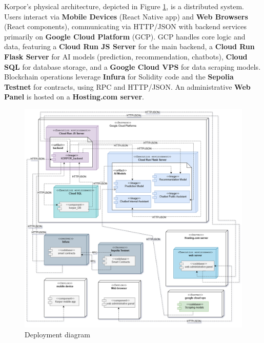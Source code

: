 Korpor's physical architecture, depicted in Figure \ref{fig:physical-architecture}, is a distributed system. Users interact via \textbf{\textcolor{primary}{Mobile Devices}} (React Native app) and \textbf{\textcolor{primary}{Web Browsers}} (React components), communicating via HTTP/JSON with backend services primarily on \textbf{\textcolor{primary}{Google Cloud Platform}} (GCP). GCP handles core logic and data, featuring a \textbf{\textcolor{primary}{Cloud Run JS Server}} for the main backend, a \textbf{\textcolor{primary}{Cloud Run Flask Server}} for AI models (prediction, recommendation, chatbots), \textbf{\textcolor{primary}{ Cloud SQL}} for database storage, and a \textbf{\textcolor{primary}{Google Cloud VPS}} for data scraping models. Blockchain operations leverage \textbf{\textcolor{primary}{Infura}} for Solidity code and the \textbf{\textcolor{primary}{Sepolia Testnet}} for contracts, using RPC and HTTP/JSON. An administrative \textbf{\textcolor{primary}{Web Panel}} is hosted on a \textbf{\textcolor{primary}{Hosting.com server}}. 

\begin{figure}[htbp]
    \centering
    \includegraphics[width=1.03\textwidth]{images/deploiement_general_diag.png}
    \caption{Deployment diagram}
    \label{fig:physical-architecture}
\end{figure}

